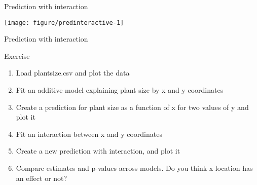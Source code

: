 \documentclass[10pt]{beamer}\usepackage[]{graphicx}\usepackage[]{color}
\newenvironment{knitrout}{}{} %
\begin{document}
  \begin{frame}[fragile]{Prediction with interaction}

\begin{knitrout}\small
{}\color{fgcolor}
\texttt{[image: figure/predinteractive-1]} 

\end{knitrout}

\end{frame}
\begin{frame}[fragile]{Prediction with interaction}
  \begin{exampleblock}{Exercise}
    \begin{enumerate}
      \item Load plantsize.csv and plot the data
      \item Fit an additive model explaining plant size by x and y coordinates
     \item Create a prediction for plant size as a function of x for two values of y and plot it
     \item Fit an interaction between x and y coordinates
     \item Create a new prediction with interaction, and plot it
     \item Compare estimates and p-values across models. Do you think x location has an effect or not?
    \end{enumerate}
  \end{exampleblock}
\end{frame}
\end{document}
